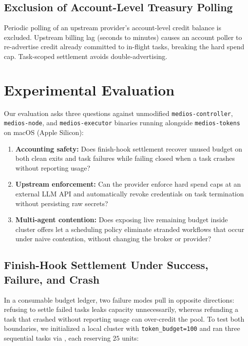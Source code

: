 \documentclass[11pt]{article}
\begin{document}
\subsection{Exclusion of Account-Level Treasury Polling}
Periodic polling of an upstream provider's account-level credit balance is excluded. Upstream billing lag (seconds to minutes) causes an account poller to re-advertise credit already committed to in-flight tasks, breaking the hard spend cap. Task-scoped settlement avoids double-advertising.

\section{Experimental Evaluation}
\label{sec:eval}

Our evaluation asks three questions against unmodified \texttt{medios-controller}, \texttt{medios-node}, and \texttt{medios-executor} binaries running alongside \texttt{medios-tokens} on macOS (Apple Silicon):

\begin{enumerate}
  \item \textbf{Accounting safety:} Does finish-hook settlement recover unused budget on both clean exits and task failures while failing closed when a task crashes without reporting usage?
  \item \textbf{Upstream enforcement:} Can the provider enforce hard spend caps at an external LLM API and automatically revoke credentials on task termination without persisting raw secrets?
  \item \textbf{Multi-agent contention:} Does exposing live remaining budget inside cluster offers let a scheduling policy eliminate stranded workflows that occur under naive contention, without changing the broker or provider?
\end{enumerate}

\subsection{Finish-Hook Settlement Under Success, Failure, and Crash}
In a consumable budget ledger, two failure modes pull in opposite directions: refusing to settle failed tasks leaks capacity unnecessarily, whereas refunding a task that crashed without reporting usage can over-credit the pool. To test both boundaries, we initialized a local cluster with \texttt{token\_budget=100} and ran three sequential tasks via , each reserving $25$ units:
\end{document}
